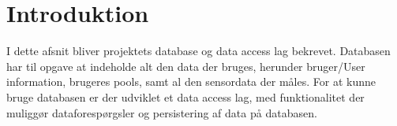 \section{Introduktion}
I dette afsnit bliver projektets database og data access lag bekrevet. Databasen har til opgave at indeholde alt den data der bruges, herunder bruger/User information, brugeres pools, samt al den sensordata der måles. For at kunne bruge databasen er der udviklet et data access lag, med funktionalitet der muliggør dataforespørgsler og persistering af data på databasen.


